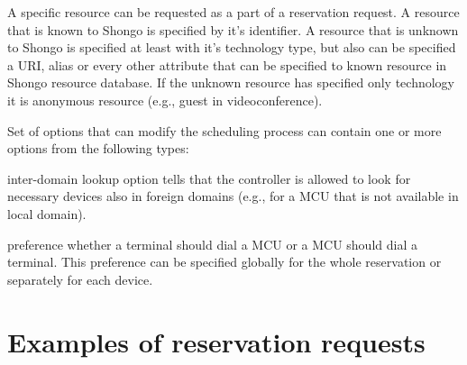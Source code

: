A specific resource can be requested as a part of a reservation request. A resource that is known to Shongo is specified by it's identifier. A resource that is unknown to Shongo is specified at least with it's technology type, but also can be specified a URI, alias or every other attribute that can be specified to known resource in Shongo resource database. If the unknown resource has specified only technology it is anonymous resource (e.g., guest in videoconference).

Set of options that can modify the scheduling process can contain one or more options from the following types:
\begin{compactitem}
\item inter-domain lookup option tells that the controller is allowed to look for necessary devices also in foreign domains (e.g., for a MCU that is not available in local domain).
\item preference whether a terminal should dial a MCU or a MCU should dial a terminal. This preference can be specified globally for the whole reservation or separately for each device.
\end{compactitem}


\section{Examples of reservation requests}

\CodeStyleAppendImplementation
\CodeStyleAppendEnum

